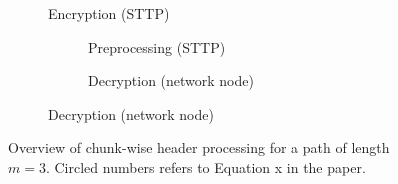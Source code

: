 \begin{figure}%
    \centering

    \begin{subfigure}[b]{0.48\linewidth}
        \resizebox{\linewidth}{!}{}
        \caption{Encryption (STTP)}
        \label{fig:chunk-encryption}
    \end{subfigure}
    \hfill
    \begin{subfigure}[b]{0.48\linewidth}

        \begin{subfigure}[t]{\linewidth}
            \centering
            \resizebox{\linewidth}{!}{}
            \caption{Preprocessing (STTP)}
            \label{fig:chunk-preprocessing}
        \end{subfigure}

        \vspace{0.5em}

        \begin{subfigure}[b]{\linewidth}
            \centering
            \resizebox{\linewidth}{!}{}
            \caption{Decryption (network node)}
            \label{fig:chunk-decryption}
        \end{subfigure}

    \end{subfigure}

    \caption{Overview of chunk-wise header processing for a path of length $m=3$. Circled numbers  refers to Equation x in the paper.}
    \label{fig:chunkwise-overview}
\end{figure}
